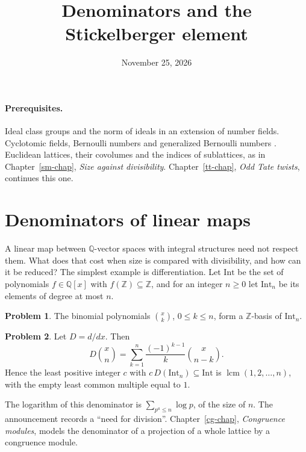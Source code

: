 \documentclass[reqno]{amsart}
\title{Denominators and the Stickelberger element}
\author{}
\date{November 25, 2026}
\newcounter{chap}
\theoremstyle{definition}
\newtheorem{problem}{Problem}[section]
\theoremstyle{plain}
\newcommand{\Z}{\mathbb{Z}}
\newcommand{\Q}{\mathbb{Q}}
\newcommand{\lcm}{\operatorname{lcm}}
\begin{document}
\maketitle
{}\label{chap}

\paragraph{Prerequisites.}
Ideal class groups \cite[Ch.~I, \S\S3, 6]{Ne} and the norm of ideals in an extension of number fields.  Cyclotomic fields, Bernoulli numbers and generalized Bernoulli numbers \cite[Ch.~4--6]{Wa}.  Euclidean lattices, their covolumes and the indices of sublattices, as in Chapter~\ref{sm-chap}, \emph{Size against divisibility}.  Chapter~\ref{tt-chap}, \emph{Odd Tate twists}, continues this one.

\section{Denominators of linear maps}\label{sec:denominators}

A linear map between \(\Q\)-vector spaces with integral structures need not respect them.  What does that cost when size is compared with divisibility, and how can it be reduced?  The simplest example is differentiation.  Let \(\mathrm{Int}\) be the set of polynomials \(f \in \Q[x]\) with \(f(\Z) \subseteq \Z\), and for an integer \(n\ge0\) let \(\mathrm{Int}_n\) be its elements of degree at most \(n\).

\begin{problem}\label{pr:intval}
The binomial polynomials \(\binom{x}{k}\), \(0 \le k \le n\), form a \(\Z\)-basis of \(\mathrm{Int}_n\).
\end{problem}

\begin{problem}\label{pr:derivative}
Let \(D = d/dx\).  Then
\[
  D \binom{x}{n} = \sum_{k=1}^{n} \frac{(-1)^{k-1}}{k} \binom{x}{n-k} .
\]
Hence the least positive integer \(c\) with \(c \, D(\mathrm{Int}_n) \subseteq \mathrm{Int}\) is \(\lcm(1, 2, \dots, n)\), with the empty least common multiple equal to \(1\).
\end{problem}

The logarithm of this denominator is \(\sum_{p^a \le n} \log p\), of the size of \(n\).  The announcement \cite[item~14]{Alp} records a ``need for division''.  Chapter~\ref{cg-chap}, \emph{Congruence modules}, models the denominator of a projection of a whole lattice by a congruence module.
\end{document}
